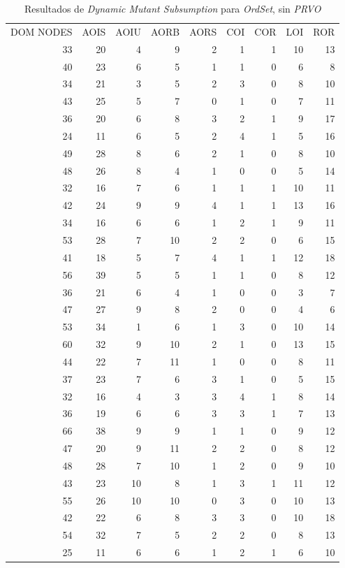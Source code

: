 \begin{table}[]
	\caption[\emph{Dynamic Mutant Subsumption} \emph{OrdSet}, sin \emph{PRVO}]{Resultados de \emph{Dynamic Mutant Subsumption} para \emph{OrdSet}, sin \emph{PRVO}}
	\label{tables.results.subsumption.ordset.noprvo}
	\centering
	\scriptsize
	\def\arraystretch{0.95}
	\setlength\tabcolsep{0.5mm}
	\begin{tabular}{rrrrrrrrr}
		DOM NODES & AOIS & AOIU & AORB & AORS & COI & COR & LOI & ROR \\
		33 & 20 & 4 & 9 & 2 & 1 & 1 & 10 & 13 \\
		40 & 23 & 6 & 5 & 1 & 1 & 0 & 6 & 8 \\
		34 & 21 & 3 & 5 & 2 & 3 & 0 & 8 & 10 \\
		43 & 25 & 5 & 7 & 0 & 1 & 0 & 7 & 11 \\
		36 & 20 & 6 & 8 & 3 & 2 & 1 & 9 & 17 \\
		24 & 11 & 6 & 5 & 2 & 4 & 1 & 5 & 16 \\
		49 & 28 & 8 & 6 & 2 & 1 & 0 & 8 & 10 \\
		48 & 26 & 8 & 4 & 1 & 0 & 0 & 5 & 14 \\
		32 & 16 & 7 & 6 & 1 & 1 & 1 & 10 & 11 \\
		42 & 24 & 9 & 9 & 4 & 1 & 1 & 13 & 16 \\
		34 & 16 & 6 & 6 & 1 & 2 & 1 & 9 & 11 \\
		53 & 28 & 7 & 10 & 2 & 2 & 0 & 6 & 15 \\
		41 & 18 & 5 & 7 & 4 & 1 & 1 & 12 & 18 \\
		56 & 39 & 5 & 5 & 1 & 1 & 0 & 8 & 12 \\
		36 & 21 & 6 & 4 & 1 & 0 & 0 & 3 & 7 \\
		47 & 27 & 9 & 8 & 2 & 0 & 0 & 4 & 6 \\
		53 & 34 & 1 & 6 & 1 & 3 & 0 & 10 & 14 \\
		60 & 32 & 9 & 10 & 2 & 1 & 0 & 13 & 15 \\
		44 & 22 & 7 & 11 & 1 & 0 & 0 & 8 & 11 \\
		37 & 23 & 7 & 6 & 3 & 1 & 0 & 5 & 15 \\
		32 & 16 & 4 & 3 & 3 & 4 & 1 & 8 & 14 \\
		36 & 19 & 6 & 6 & 3 & 3 & 1 & 7 & 13 \\
		66 & 38 & 9 & 9 & 1 & 1 & 0 & 9 & 12 \\
		47 & 20 & 9 & 11 & 2 & 2 & 0 & 8 & 12 \\
		48 & 28 & 7 & 10 & 1 & 2 & 0 & 9 & 10 \\
		43 & 23 & 10 & 8 & 1 & 3 & 1 & 11 & 12 \\
		55 & 26 & 10 & 10 & 0 & 3 & 0 & 10 & 13 \\
		42 & 22 & 6 & 8 & 3 & 3 & 0 & 10 & 18 \\
		54 & 32 & 7 & 5 & 2 & 2 & 0 & 8 & 13 \\
		25 & 11 & 6 & 6 & 1 & 2 & 1 & 6 & 10
	\end{tabular}
\end{table}

